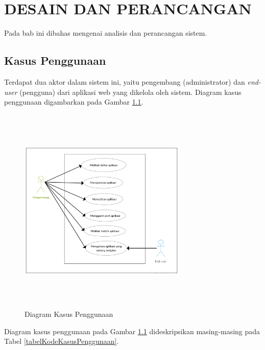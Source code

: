 \chapter{DESAIN DAN PERANCANGAN}
    Pada bab ini dibahas mengenai analisis dan perancangan sistem.
	
    \section{Kasus Penggunaan}
    	Terdapat dua aktor dalam sistem ini, yaitu pengembang (administrator) dan \textit{end-user} (pengguna) dari aplikasi web yang dikelola oleh sistem. Diagram kasus penggunaan digambarkan pada Gambar \ref{usecase}.
        \begin{figure}[H]
			\centering
			\includegraphics[width=8cm,height=10cm]{Images/C-3/usecase.png}
			\caption{Diagram Kasus Penggunaan}
			\label{usecase}
		\end{figure}
        \indent Diagram kasus penggunaan pada Gambar \ref{usecase} dideskripsikan masing-masing pada Tabel \ref {tabelKodeKasusPenggunaan}.
        
